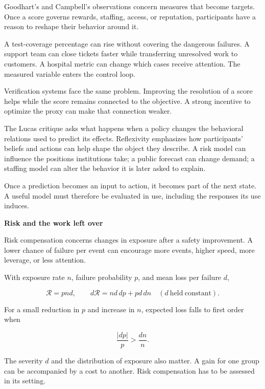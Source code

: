 \documentclass[11pt,openany]{book}
\newcommand{\subhead}[1]{\par\medskip\noindent\textbf{#1}\par\nobreak\smallskip}
\begin{document}
Goodhart's and Campbell's observations concern measures that become targets.\cite{goodhart1975problems,campbell1979assessing} Once a score governs rewards, staffing, access, or reputation, participants have a reason to reshape their behavior around it.

A test-coverage percentage can rise without covering the dangerous failures. A support team can close tickets faster while transferring unresolved work to customers. A hospital metric can change which cases receive attention. The measured variable enters the control loop.

Verification systems face the same problem. Improving the resolution of a score helps while the score remains connected to the objective. A strong incentive to optimize the proxy can make that connection weaker.

The Lucas critique asks what happens when a policy changes the behavioral relations used to predict its effects.\cite{lucas1976econometric} Reflexivity emphasizes how participants' beliefs and actions can help shape the object they describe.\cite{soros1987alchemy} A risk model can influence the positions institutions take; a public forecast can change demand; a staffing model can alter the behavior it is later asked to explain.

Once a prediction becomes an input to action, it becomes part of the next state. A useful model must therefore be evaluated in use, including the responses its use induces.

\subhead{Risk and the work left over}

Risk compensation concerns changes in exposure after a safety improvement.\cite{peltzman1975effects} A lower chance of failure per event can encourage more events, higher speed, more leverage, or less attention.

With exposure rate $n$, failure probability $p$, and mean loss per failure $d$,

\begin{equation}
\mathcal R=pnd,
\qquad
d\mathcal R=nd\,dp+pd\,dn
\quad(d\ \mathrm{held\ constant}).
\end{equation}

For a small reduction in $p$ and increase in $n$, expected loss falls to first order when

\begin{equation}
\frac{|dp|}{p}>\frac{dn}{n}.
\end{equation}

The severity $d$ and the distribution of exposure also matter. A gain for one group can be accompanied by a cost to another. Risk compensation has to be assessed in its setting.
\end{document}
